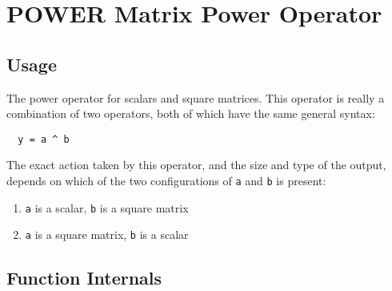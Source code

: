 \section{POWER Matrix Power Operator}

\subsection{Usage}

The power operator for scalars and square matrices.  This operator is really a 
combination of two operators, both of which have the same general syntax:
\begin{verbatim}
  y = a ^ b
\end{verbatim}
The exact action taken by this operator, and the size and type of the output, 
depends on which of the two configurations of \verb|a| and \verb|b| is present:
\begin{enumerate}
\item  \verb|a| is a scalar, \verb|b| is a square matrix

\item  \verb|a| is a square matrix, \verb|b| is a scalar

\end{enumerate}
\subsection{Function Internals}


